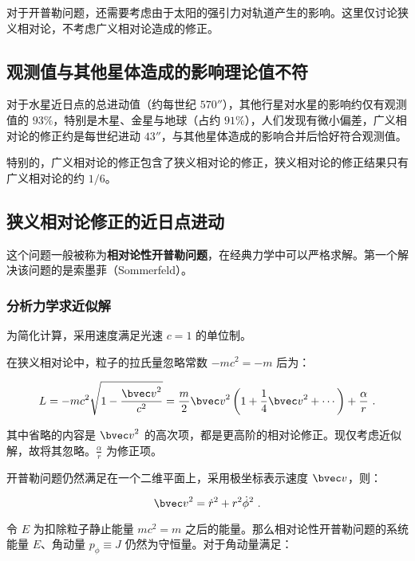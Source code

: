 
\begin{issues}
\issueDraft
\end{issues}




对于开普勒问题，还需要考虑由于太阳的强引力对轨道产生的影响。这里仅讨论狭义相对论，不考虑广义相对论造成的修正。

\subsection{观测值与其他星体造成的影响理论值不符}
对于水星近日点的总进动值（约每世纪 $570''$），其他行星对水星的影响约仅有观测值的 $93 \%$，特别是木星、金星与地球（占约 $91\%$），人们发现有微小偏差，广义相对论的修正约是每世纪进动 $43''$，与其他星体造成的影响合并后恰好符合观测值。

特别的，广义相对论的修正包含了狭义相对论的修正，狭义相对论的修正结果只有广义相对论的约 $1/6$。

\subsection{狭义相对论修正的近日点进动}
这个问题一般被称为\textbf{相对论性开普勒问题}，在经典力学中可以严格求解。第一个解决该问题的是索墨菲（Sommerfeld）。

\subsubsection{分析力学求近似解}
为简化计算，采用速度满足光速 $c=1$ 的单位制。

在狭义相对论中，粒子的拉氏量忽略常数 $-mc^2 = -m$ 后为：

$$L = -mc^2 \sqrt{1- \frac{{\bvec v}^2}{c^2}} = \frac{m}{2} {\bvec v}^2 \left( 1+\frac{1}{4} {\bvec v}^2 + \cdots \right) + \frac{\alpha}{r} ~.$$

其中省略的内容是 ${\bvec v}^2$ 的高次项，都是更高阶的相对论修正。现仅考虑近似解，故将其忽略。$\frac{\alpha}{r}$ 为修正项。

开普勒问题仍然满足在一个二维平面上，采用极坐标表示速度 $\bvec v$，则：

$${\bvec v}^2 = \dot r^2 + r^2 \dot \phi^2 ~.$$

令 $E$ 为扣除粒子静止能量 $mc^2 = m$ 之后的能量。那么相对论性开普勒问题的系统能量 $E$、角动量 $p_\phi \equiv J$ 仍然为守恒量。对于角动量满足：


